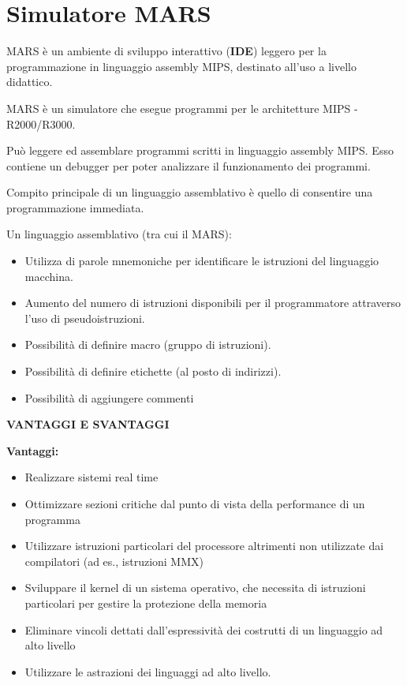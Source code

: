 \documentclass[12pt]{article} %
\begin{document}
\section{Simulatore MARS}
MARS è un ambiente di sviluppo interattivo (\textbf{IDE}) leggero per la programmazione in linguaggio assembly MIPS, destinato all'uso a livello didattico.\par\medskip\noindent 
MARS è un simulatore che esegue programmi per le architetture MIPS - R2000/R3000.\par\medskip\noindent 
Può leggere ed assemblare programmi scritti in linguaggio assembly MIPS. Esso contiene un debugger per poter analizzare il funzionamento dei programmi.\par\medskip\noindent
Compito principale di un linguaggio assemblativo è quello di consentire una programmazione immediata.\par\medskip\noindent
Un linguaggio assemblativo (tra cui il MARS): 
\begin{itemize}
\item Utilizza di parole mnemoniche per identificare le istruzioni del linguaggio macchina.
\item Aumento del numero di istruzioni disponibili per il programmatore attraverso l’uso di pseudoistruzioni.
\item Possibilità di definire macro (gruppo di istruzioni).
\item Possibilità di definire etichette (al posto di indirizzi).
\item Possibilità di aggiungere commenti
\end{itemize}
\vspace{\baselineskip}
\textbf{VANTAGGI E SVANTAGGI}\par\medskip\noindent
\textbf{Vantaggi:}
\begin{itemize}
\item Realizzare sistemi real time
\item Ottimizzare sezioni critiche dal punto di vista della performance di un programma 
\item Utilizzare istruzioni particolari del processore altrimenti non utilizzate dai compilatori (ad es., istruzioni MMX)
\item Sviluppare il kernel di un sistema operativo, che necessita di istruzioni particolari per gestire la protezione della memoria
\item Eliminare vincoli dettati dall’espressività dei costrutti di un linguaggio ad alto livello 
\item Utilizzare le astrazioni dei linguaggi ad alto livello.\par\medskip\noindent
\end{itemize}
\end{document}
